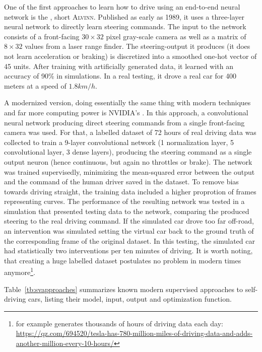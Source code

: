One of the first approaches to learn how to drive using an end-to-end neural network is the , short \textsc{Alvinn}\cite{pomerleau_alvinn:_1989}. Published as early as 1989, it uses a three-layer neural network to directly learn steering commands. The input to the network consists of a front-facing $30\times32$ pixel gray-scale camera as well as a matrix of $8\times32$ values from a laser range finder. The steering-output it produces (it does not learn acceleration or braking) is discretized into a smoothed one-hot vector of 45 units. After training with artificially generated data, it learned with an accuracy of 90\% in simulations. In a real testing, it drove a real car for 400 meters at a speed of $1.8 km/h$. 

A modernized version, doing essentially the same thing with modern techniques and far more computing power is NVIDIA's \cite{bojarski_end_2016}. In this approach, a convolutional neural network producing direct steering commands from a single front-facing camera was used. For that, a labelled dataset of 72 hours of real driving data was collected to train a 9-layer convolutional network (1 normalization layer, 5 convolutional layer, 3 dense layers), producing the steering command as a single output neuron (hence continuous, but again no throttles or brake). The network was trained supervisedly, minimizing the mean-squared error between the output and the command of the human driver saved in the dataset. To remove bias towards driving straight, the training data included a higher proprotion of frames representing curves. 
The performance of the resulting network was tested in a simulation that presented testing data to the network, comparing the produced steering to the real driving command. If the simulated car drove too far off-road, an intervention was simulated setting the virtual car back to the ground truth of the corresponding frame of the original dataset. In this testing, the simulated car had statistically two interventions per ten minutes of driving. It is worth noting, that creating a huge labelled dataset postulates no problem in modern times anymore\footnote{ for example generates thousands of hours of driving data each day: \url{https://qz.com/694520/tesla-has-780-million-miles-of-driving-data-and-adds-another-million-every-10-hours/}}.

Table~\ref{tb:svapproaches} summarizes known modern supervised approaches to self-driving cars, listing their model, input, output and optimization function.


